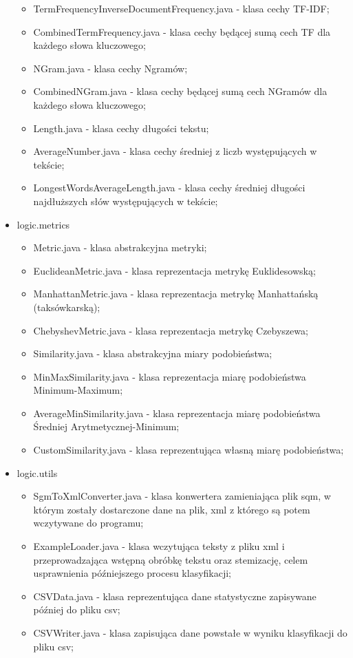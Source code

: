 \documentclass{classrep}
\begin{document}
\begin{itemize}
\begin{itemize}
		\item TermFrequencyInverseDocumentFrequency.java - klasa cechy TF-IDF; 
		\item CombinedTermFrequency.java - klasa cechy będącej sumą cech TF dla każdego słowa kluczowego;
		\item NGram.java - klasa cechy Ngramów;
		\item CombinedNGram.java - klasa cechy będącej sumą cech NGramów dla każdego słowa kluczowego;
		\item Length.java - klasa cechy długości tekstu;
		\item AverageNumber.java - klasa cechy średniej z liczb występujących w tekście;
		\item LongestWordsAverageLength.java - klasa cechy średniej długości najdłuższych słów występujących w tekście;
	\end{itemize}
	\item logic.metrics
	\begin{itemize}
		\item Metric.java - klasa abstrakcyjna metryki;
		\item EuclideanMetric.java - klasa reprezentacja metrykę Euklidesowską;
		\item ManhattanMetric.java - klasa reprezentacja metrykę Manhattańską (taksówkarską);
		\item ChebyshevMetric.java - klasa reprezentacja metrykę Czebyszewa;
		\item Similarity.java - klasa abstrakcyjna miary podobieństwa;
		\item MinMaxSimilarity.java - klasa reprezentacja miarę podobieństwa Minimum-Maximum;
		\item AverageMinSimilarity.java - klasa reprezentacja miarę podobieństwa Średniej Arytmetycznej-Minimum;
		\item CustomSimilarity.java - klasa reprezentująca własną miarę podobieństwa;
	\end{itemize}
	\item logic.utils
	\begin{itemize}
		\item SgmToXmlConverter.java - klasa konwertera zamieniająca plik sqm, w którym zostały dostarczone dane na plik, xml z którego są potem wczytywane do programu;
		\item ExampleLoader.java - klasa wczytująca teksty z pliku xml i przeprowadzająca wstępną obróbkę tekstu oraz stemizację, celem usprawnienia późniejszego procesu klasyfikacji;
		\item CSVData.java - klasa reprezentująca dane statystyczne zapisywane później do pliku csv;
		\item CSVWriter.java - klasa zapisująca dane powstałe w wyniku klasyfikacji do pliku csv;
	\end{itemize}
\end{itemize}
\end{document}
